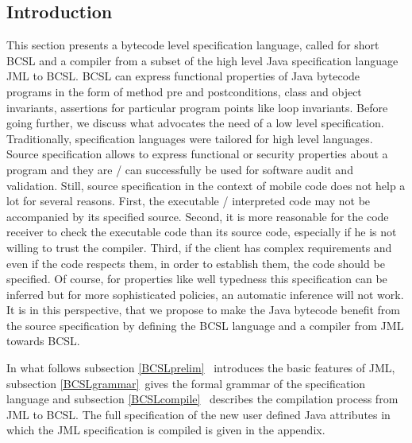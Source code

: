 


\newcommand{\code}{\textit{code}}
\newcommand{\indexComp}{\textit{index}}





\subsection{Introduction} \label{bcsl}
This section presents a bytecode level specification language, called for short BCSL and a compiler from a
 subset of the high level Java specification language JML to BCSL. 
 BCSL can express functional properties of Java bytecode programs in the form of method pre and postconditions, class and object 
invariants, assertions for particular program points like loop invariants.  Before going further, we discuss what advocates the need of a low level specification.
Traditionally, specification languages were tailored for high level languages. 
Source  specification allows to express functional or security properties about a program and they are / can successfully be used 
for software audit and validation. Still, source specification in the context of mobile code does not help a lot for several reasons.
First, the executable / interpreted code  may not be accompanied by its specified  source. Second, it is more reasonable for the 
code receiver to check the executable code than its source code, especially if he is not willing to trust the compiler. 
Third, if the client has complex requirements and even if the code respects them, in order to establish them, 
the code should be specified. Of course, for properties like well typedness this specification can be inferred  
but  for more sophisticated policies, an automatic inference will not work. It is in this perspective, that we propose to make the Java
bytecode benefit from the source specification by defining the BCSL language and a compiler from JML towards BCSL.    

In what follows subsection \ref{BCSLprelim} \ introduces the basic features of JML, subsection \ref{BCSLgrammar}~gives the formal grammar
 of the specification language and subsection 
 \ref{BCSLcompile} \ describes the compilation process from JML to BCSL.
  The full specification of the new user defined Java attributes in which the JML specification is compiled is given in the appendix.






